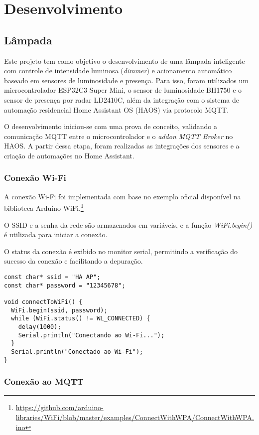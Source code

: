 \documentclass[]{abntex2}
\begin{document}
\chapter{Desenvolvimento}
\section{Lâmpada}
Este projeto tem como objetivo o desenvolvimento de uma lâmpada inteligente com
controle de intensidade luminosa (\textit{dimmer}) e acionamento automático
baseado em sensores de luminosidade e presença. Para isso, foram utilizados um
microcontrolador ESP32C3 Super Mini, o sensor de luminosidade BH1750 e o sensor de presença por
radar LD2410C, além da integração com o sistema de automação residencial Home
Assistant OS (HAOS) via protocolo MQTT.

O desenvolvimento iniciou-se com uma prova de conceito, validando a comunicação
MQTT entre o microcontrolador e o \textit{addon} \textit{MQTT Broker} no HAOS.
A partir dessa etapa, foram realizadas as integrações dos sensores e a criação
de automações no Home Assistant.

\subsection{Conexão Wi-Fi}

A conexão Wi-Fi foi implementada com base no exemplo oficial disponível na
biblioteca Arduino
WiFi.\footnote{\url{https://github.com/arduino-libraries/WiFi/blob/master/examples/ConnectWithWPA/ConnectWithWPA.ino}}

O SSID e a senha da rede são armazenados em variáveis, e a função
\textit{WiFi.begin()} é utilizada para iniciar a conexão.

O status da conexão é exibido no monitor serial, permitindo a verificação do
sucesso da conexão e facilitando a depuração.

\begin{verbatim}
const char* ssid = "HA AP";
const char* password = "12345678";

void connectToWiFi() {
  WiFi.begin(ssid, password);
  while (WiFi.status() != WL_CONNECTED) {
    delay(1000);
    Serial.println("Conectando ao Wi-Fi...");
  }
  Serial.println("Conectado ao Wi-Fi");
}
\end{verbatim}
\clearpage


\subsection{Conexão ao MQTT}
\end{document}
